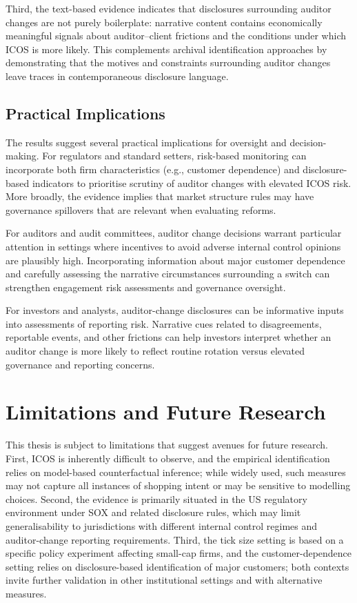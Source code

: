 \documentclass[12pt, a4paper]{report}
\begin{document}
Third, the text-based evidence indicates that disclosures surrounding auditor changes are not purely boilerplate: narrative content contains economically meaningful signals about auditor--client frictions and the conditions under which ICOS is more likely. This complements archival identification approaches by demonstrating that the motives and constraints surrounding auditor changes leave traces in contemporaneous disclosure language.

\subsection{Practical Implications}

The results suggest several practical implications for oversight and decision-making. For regulators and standard setters, risk-based monitoring can incorporate both firm characteristics (e.g., customer dependence) and disclosure-based indicators to prioritise scrutiny of auditor changes with elevated ICOS risk. More broadly, the evidence implies that market structure rules may have governance spillovers that are relevant when evaluating reforms.

For auditors and audit committees, auditor change decisions warrant particular attention in settings where incentives to avoid adverse internal control opinions are plausibly high. Incorporating information about major customer dependence and carefully assessing the narrative circumstances surrounding a switch can strengthen engagement risk assessments and governance oversight.

For investors and analysts, auditor-change disclosures can be informative inputs into assessments of reporting risk. Narrative cues related to disagreements, reportable events, and other frictions can help investors interpret whether an auditor change is more likely to reflect routine rotation versus elevated governance and reporting concerns.

\section{Limitations and Future Research}

This thesis is subject to limitations that suggest avenues for future research. First, ICOS is inherently difficult to observe, and the empirical identification relies on model-based counterfactual inference; while widely used, such measures may not capture all instances of shopping intent or may be sensitive to modelling choices. Second, the evidence is primarily situated in the US regulatory environment under SOX and related disclosure rules, which may limit generalisability to jurisdictions with different internal control regimes and auditor-change reporting requirements. Third, the tick size setting is based on a specific policy experiment affecting small-cap firms, and the customer-dependence setting relies on disclosure-based identification of major customers; both contexts invite further validation in other institutional settings and with alternative measures.
\end{document}
